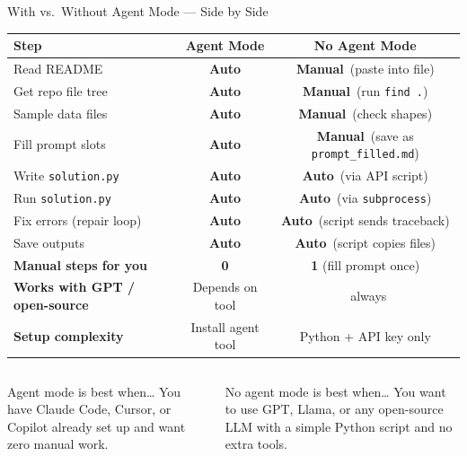 \documentclass[aspectratio=169,t,10pt]{beamer}
\newcommand{\yes}{\textcolor{GNNgreen}{\bfseries\checkmark}}
\newcommand{\auto}{\textcolor{GNNgreen}{\bfseries Auto}}
\newcommand{\manual}{\textcolor{GNNorange}{\bfseries Manual}}
\begin{document}
\begin{frame}{With vs.\ Without Agent Mode --- Side by Side}

\vspace{4pt}
\begin{center}
{\small
\setlength{\tabcolsep}{6pt}
\begin{tabular}{@{}lcc@{}}
\toprule
\textbf{Step} & \textbf{Agent Mode} & \textbf{No Agent Mode} \\
\midrule
Read README           & \auto  & \manual\ (paste into file) \\
Get repo file tree    & \auto  & \manual\ (run \texttt{find .}) \\
Sample data files     & \auto  & \manual\ (check shapes) \\
Fill prompt slots     & \auto  & \manual\ (save as \texttt{prompt\_filled.md}) \\
Write \texttt{solution.py}     & \auto  & \auto\ (via API script) \\
Run \texttt{solution.py}       & \auto  & \auto\ (via \texttt{subprocess}) \\
Fix errors (repair loop) & \auto & \auto\ (script sends traceback) \\
Save outputs          & \auto  & \auto\ (script copies files) \\
\midrule
\textbf{Manual steps for you} & \textbf{0} & \textbf{1} (fill prompt once) \\
\textbf{Works with GPT / open-source} & Depends on tool & \yes\ always \\
\textbf{Setup complexity} & Install agent tool & Python + API key only \\
\bottomrule
\end{tabular}
}
\end{center}

\vspace{6pt}
\begin{columns}[T]
\begin{block}{Agent mode is best when\ldots}
{\scriptsize
You have Claude Code, Cursor, or Copilot already set up
and want zero manual work.
}
\end{block}
\begin{exampleblock}{No agent mode is best when\ldots}
{\scriptsize
You want to use GPT, Llama, or any open-source LLM
with a simple Python script and no extra tools.
}
\end{exampleblock}
\end{columns}

\end{frame}
\end{document}
